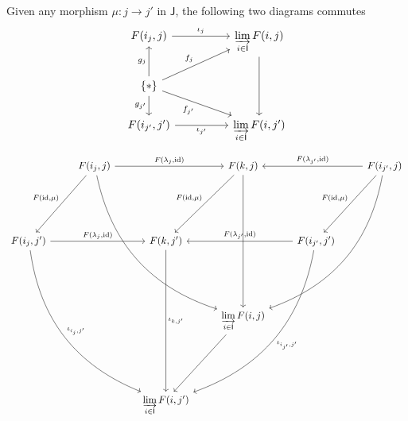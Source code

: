 \begin{prf}
\begin{enumerate}[(i)]
        Given any morphism $\mu:j\to j'$ in $\mathsf{J}$, the following two diagrams commutes
        \[
            \begin{tikzcd}
                {F(i_j,j)} \arrow[rr, "\iota_j"]                                                        &  & {\varinjlim\limits_{i\in\mathsf{I}} F(i,j)} \arrow[dd] \\
                \{*\} \arrow[u, "g_{j}"] \arrow[d, "g_{j'}"'] \arrow[rru, "f_j"] \arrow[rrd, "f_{j'}"'] &  &                                                 \\
                {F(i_{j'},j')} \arrow[rr, "\iota_{j'}"']                                                &  & {\varinjlim\limits_{i\in\mathsf{I}} F(i,j')}          
                \end{tikzcd}
        \]
        \[
            \begin{tikzcd}
                & {F(i_j,j)} \arrow[ld, "{F(\mathrm{id},\mu)}"'] \arrow[rr, "{F(\lambda_j,\mathrm{id})}"] \arrow[rrdd, bend right] &                                        & {F(k,j)} \arrow[ld, "{F(\mathrm{id},\mu)}"'] \arrow[dd] &                                                                                                            & {F(i_{j'},j)} \arrow[ld, "{F(\mathrm{id},\mu)}"'] \arrow[ll, "{F(\lambda_{j'},\mathrm{id})}"'] \arrow[lldd, bend left] \\[4em]
{F(i_{j},j')} \arrow[rr, "{F(\lambda_{j},\mathrm{id})}"] \arrow[rrdd, "{\iota_{i_j,j'}}", bend right] &                                                                                                                  & {F(k,j')} \arrow[dd, "{\iota_{k,j'}}"] &                                                         & {F(i_{j'},j')} \arrow[ll, "{F(\lambda_{j'},\mathrm{id})}"'] \arrow[lldd, "{\iota_{i_{j'},j'}}", bend left] &                                                                                                                        \\[4em]
                &                                                                                                                  &                                        & {\varinjlim\limits_{i\in\mathsf{I}} F(i,j)} \arrow[ld]         &                                                                                                            &                                                                                                                        \\[4em]
                &                                                                                                                  & {\varinjlim\limits_{i\in\mathsf{I}} F(i,j')}  &                                                         &                                                                                                            &                                                                                                                       

\end{tikzcd}\]
\end{enumerate}
\end{prf}
